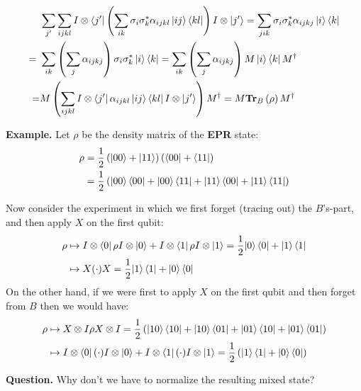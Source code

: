 \documentclass[12pt,a4paper]{article}
\begin{document}
\begin{equation*}
\begin{split}
    \ & \sum_{j^\prime} \sum_{ijkl}{  I \otimes\bra{j^\prime} \left(\sum_{ik}{ \sigma_{i}\sigma^{*}_{k}\alpha_{ijkl}\ket{ij}\bra{kl} } \right) I \otimes \ket{j^\prime} } = \sum_{jik}{ \sigma_{i}\sigma^{*}_{k}\alpha_{ijkj}\ket{i}\bra{k} } \\
     = \ &\sum_{ik}{\left(\sum_{j}{ \alpha_{ijkj}}\right)\sigma_{i}\sigma^{*}_{k}\ket{i}\bra{k} } = \sum_{ik}{\left(\sum_{j}{ \alpha_{ijkj}}\right)M\ket{i}\bra{k}M^\dagger } \\
     =  & M \left(\sum_{ijkl} I \otimes \bra{j^\prime} \alpha_{ijkl}\ket{ij}\bra{kl}  I \otimes\ket{j^\prime}  \right) M^\dagger = M \mathbf{Tr}_{B}\left( \rho \right) M^\dagger
\end{split}
\end{equation*}

\textbf{Example.} Let $\rho$ be the density matrix of the \textbf{EPR} state:
\begin{equation*}
\begin{split}
    \rho &= \frac{1}{2}\left( \ket{00} + \ket{11} \right)\left( \bra{00} + \bra{11} \right) \\ &= \frac{1}{2}\left( \ket{00}\bra{00}+ \ket{00}\bra{11} + \ket{11}\bra{00} + \ket{11}\bra{11} \right)
    \end{split}
\end{equation*}

Now consider the experiment in which we first forget (tracing out) the $B$'s-part, and then apply $X$ on the first qubit: 
\begin{equation*}
\begin{split}
    \rho &\mapsto  I\otimes \bra{0} \rho I \otimes \ket{0} + I\otimes \bra{1} \rho I \otimes \ket{1} = \frac{1}{2}{\ket{0}\bra{0} + \ket{1}\bra{1}} \\
    & \mapsto X ( \cdot ) X = \frac{1}{2}{\ket{1}\bra{1} + \ket{0}\bra{0}} 
    \end{split}
\end{equation*}
On the other hand, if we were first to apply $X$ on the first qubit and then forget from $B$ then we would have: 
\begin{equation*}
\begin{split}
    \rho &\mapsto  X\otimes I \rho X \otimes I = \frac{1}{2}\left( \ket{10}\bra{10}+ \ket{10}\bra{01} + \ket{01}\bra{10} + \ket{01}\bra{01} \right) \\
    & \mapsto I \otimes \bra{0} ( \cdot ) I \otimes \ket{0} + I \otimes \bra{1} ( \cdot ) I \otimes \ket{1} = \frac{1}{2} \left({\ket{1}\bra{1} + \ket{0}\bra{0}} \right) 
    \end{split}
\end{equation*}

\textbf{Question.} Why don't we have to normalize the resulting mixed state?  
\printbibliography 
\end{document}
